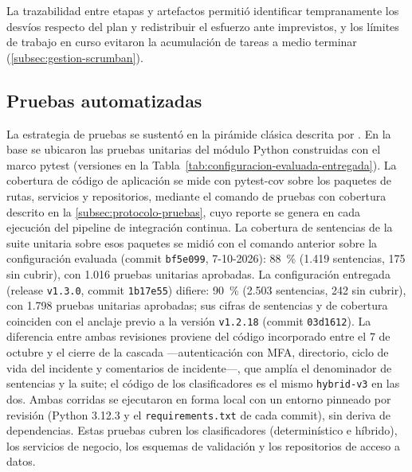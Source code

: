 La trazabilidad entre etapas y artefactos permitió identificar tempranamente los desvíos respecto del plan y redistribuir el esfuerzo ante imprevistos, y los límites de trabajo en curso evitaron la acumulación de tareas a medio terminar (\autoref{subsec:gestion-scrumban}).

\subsection{Pruebas automatizadas}\label{subsec:pruebas-automatizadas}

La estrategia de pruebas se sustentó en la pirámide clásica descrita por \textcite{Crispin2009_agile_testing}. En la base se ubicaron las pruebas unitarias del módulo Python construidas con el marco pytest (versiones en la Tabla~\ref{tab:configuracion-evaluada-entregada}). La cobertura de código de aplicación se mide con pytest-cov sobre los paquetes de rutas, servicios y repositorios, mediante el comando de pruebas con cobertura descrito en la \autoref{subsec:protocolo-pruebas}, cuyo reporte se genera en cada ejecución del pipeline de integración continua. La cobertura de sentencias de la suite unitaria sobre esos paquetes se midió con el comando anterior sobre la configuración evaluada (commit \texttt{bf5e099}, 7-10-2026): 88~\% (1.419 sentencias, 175 sin cubrir), con 1.016 pruebas unitarias aprobadas. La configuración entregada (release \texttt{v1.3.0}, commit \texttt{1b17e55}) difiere: 90~\% (2.503 sentencias, 242 sin cubrir), con 1.798 pruebas unitarias aprobadas; sus cifras de sentencias y de cobertura coinciden con el anclaje previo a la versión \texttt{v1.2.18} (commit \texttt{03d1612}). La diferencia entre ambas revisiones proviene del código incorporado entre el 7 de octubre y el cierre de la cascada ---autenticación con MFA, directorio, ciclo de vida del incidente y comentarios de incidente---, que amplía el denominador de sentencias y la suite; el código de los clasificadores es el mismo \texttt{hybrid-v3} en las dos. Ambas corridas se ejecutaron en forma local con un entorno pinneado por revisión (Python 3.12.3 y el \texttt{requirements.txt} de cada commit), sin deriva de dependencias. Estas pruebas cubren los clasificadores (determinístico e híbrido), los servicios de negocio, los esquemas de validación y los repositorios de acceso a datos.

